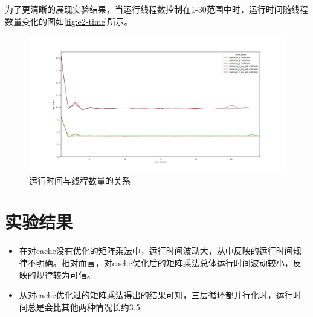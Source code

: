 \documentclass[forprint]{myreport}
\begin{document}
为了更清晰的展现实验结果，当运行线程数控制在1-30范围中时，运行时间随线程数量变化的图如\autoref{fig:e2-time}所示。
\begin{figure}[htp]
    \centering
    \includegraphics[width=15cm]{"../figure/2018-05-06-16-50-54.png"}
    \caption{运行时间与线程数量的关系}
    \label{fig:e2-time}
\end{figure}


\section{实验结果}

\begin{itemize}
    \item 在对cache没有优化的矩阵乘法中，运行时间波动大，从中反映的运行时间规律不明确。相对而言，对cache优化后的矩阵乘法总体运行时间波动较小，反映的规律较为可信。
    \item 从对cache优化过的矩阵乘法得出的结果可知，三层循环都并行化时，运行时间总是会比其他两种情况长约3.5%
    
\end{itemize}




% 
% 
\end{document}
